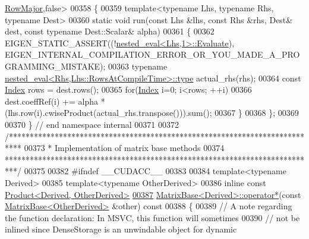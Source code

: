 \begin{DoxyCode}
      \hyperlink{group__enums_ggaacded1a18ae58b0f554751f6cdf9eb13acfcde9cd8677c5f7caf6bd603666aae3}{RowMajor},false>
00358 \{
00359   \textcolor{keyword}{template}<\textcolor{keyword}{typename} Lhs, \textcolor{keyword}{typename} Rhs, \textcolor{keyword}{typename} Dest>
00360   \textcolor{keyword}{static} \textcolor{keywordtype}{void} run(\textcolor{keyword}{const} Lhs &lhs, \textcolor{keyword}{const} Rhs &rhs, Dest& dest, \textcolor{keyword}{const} \textcolor{keyword}{typename} Dest::Scalar& alpha)
00361   \{
00362     EIGEN\_STATIC\_ASSERT((!\hyperlink{struct_eigen_1_1internal_1_1nested__eval}{nested\_eval<Lhs,1>::Evaluate}),
      EIGEN\_INTERNAL\_COMPILATION\_ERROR\_OR\_YOU\_MADE\_A\_PROGRAMMING\_MISTAKE);
00363     \textcolor{keyword}{typename} \hyperlink{class_eigen_1_1internal_1_1_tensor_lazy_evaluator_writable}{nested\_eval<Rhs,Lhs::RowsAtCompileTime>::type} 
      actual\_rhs(rhs);
00364     \textcolor{keyword}{const} \hyperlink{namespace_eigen_a62e77e0933482dafde8fe197d9a2cfde}{Index} rows = dest.rows();
00365     \textcolor{keywordflow}{for}(\hyperlink{namespace_eigen_a62e77e0933482dafde8fe197d9a2cfde}{Index} i=0; i<rows; ++i)
00366       dest.coeffRef(i) += alpha * (lhs.row(i).cwiseProduct(actual\_rhs.transpose())).sum();
00367   \}
00368 \};
00369 
00370 \} \textcolor{comment}{// end namespace internal}
00371 
00372 \textcolor{comment}{/***************************************************************************}
00373 \textcolor{comment}{* Implementation of matrix base methods}
00374 \textcolor{comment}{***************************************************************************/}
00375 
00382 \textcolor{preprocessor}{#ifndef \_\_CUDACC\_\_}
00383 
00384 \textcolor{keyword}{template}<\textcolor{keyword}{typename} Derived>
00385 \textcolor{keyword}{template}<\textcolor{keyword}{typename} OtherDerived>
00386 \textcolor{keyword}{inline} \textcolor{keyword}{const} \hyperlink{group___core___module_class_eigen_1_1_product}{Product<Derived, OtherDerived>}
\hyperlink{group___core___module_ae2d220efbf7047f0894787888288cfcc}{00387} \hyperlink{group___core___module_ae2d220efbf7047f0894787888288cfcc}{MatrixBase<Derived>::operator*}(\textcolor{keyword}{const} 
      \hyperlink{group___core___module_class_eigen_1_1_matrix_base}{MatrixBase<OtherDerived>} &other)\textcolor{keyword}{ const}
00388 \textcolor{keyword}{}\{
00389   \textcolor{comment}{// A note regarding the function declaration: In MSVC, this function will sometimes}
00390   \textcolor{comment}{// not be inlined since DenseStorage is an unwindable object for dynamic}

\end{DoxyCode}
